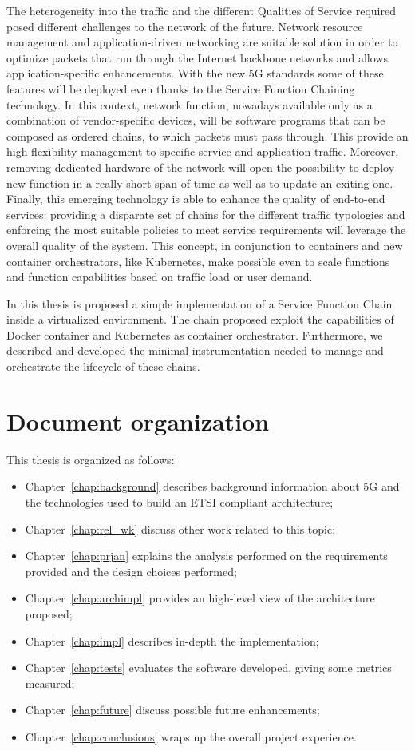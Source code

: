 The heterogeneity into the traffic and the different Qualities of Service
required posed different challenges to the network of the future. Network
resource management and application-driven networking are suitable solution in
order to optimize packets that run through the Internet backbone networks and
allows application-specific enhancements. With the new 5G standards some of
these features will be deployed even thanks to the Service Function Chaining
technology. In this context, network function, nowadays available only as a
combination of vendor-specific devices, will be software programs that can be
composed as ordered chains, to which packets must pass through. This provide an
high flexibility management to specific service and application traffic.
Moreover, removing dedicated hardware of the network will open the possibility
to deploy new function in a really short span of time as well as to update an
exiting one. Finally, this emerging technology is able to enhance the quality of
end-to-end services: providing a disparate set of chains for the different
traffic typologies and enforcing the most suitable policies to meet service
requirements will leverage the overall quality of the system. This concept, in
conjunction to containers and new container orchestrators, like Kubernetes, make
possible even to scale functions and function capabilities based on traffic load
or user demand.

In this thesis is proposed a simple implementation of a Service Function Chain
inside a virtualized environment. The chain proposed exploit the capabilities
of Docker container and Kubernetes as container orchestrator. Furthermore, we
described and developed the minimal instrumentation needed to manage and
orchestrate the lifecycle of these chains.

\section*{Document organization}

This thesis is organized as follows:
\begin{itemize}
  \item Chapter~\ref{chap:background} describes background information about 5G 
and the technologies used to build an ETSI compliant architecture;
  \item Chapter~\ref{chap:rel_wk} discuss other work related to this topic;
  \item Chapter~\ref{chap:prjan} explains the analysis performed on the 
requirements provided and the design choices performed;
  \item Chapter~\ref{chap:archimpl} provides an high-level view of
  the architecture proposed;
  \item Chapter~\ref{chap:impl} describes in-depth the implementation;
  \item Chapter~\ref{chap:tests} evaluates the software developed, giving some
  metrics measured;
  \item Chapter~\ref{chap:future} discuss possible future enhancements;
  \item Chapter~\ref{chap:conclusions} wraps up the overall project experience.
\end{itemize}